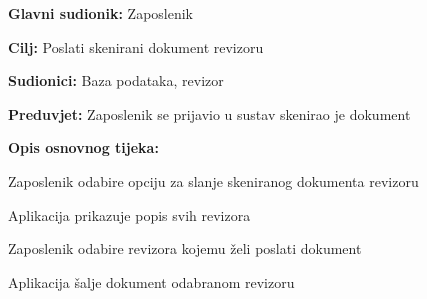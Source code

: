 					\noindent {}
					\begin{packed_item}
	
						\item \textbf{Glavni sudionik:} Zaposlenik
						\item  \textbf{Cilj:} Poslati skenirani dokument revizoru
						\item  \textbf{Sudionici:} Baza podataka, revizor
						\item  \textbf{Preduvjet:} Zaposlenik se prijavio u sustav skenirao je dokument
						\item  \textbf{Opis osnovnog tijeka:}
						
						\item[] \begin{packed_enum}
	
							\item Zaposlenik odabire opciju za slanje skeniranog dokumenta revizoru
							\item Aplikacija prikazuje popis svih revizora
							\item Zaposlenik odabire revizora kojemu želi poslati dokument
							\item Aplikacija šalje dokument odabranom revizoru

						\end{packed_enum}

					\end{packed_item}


